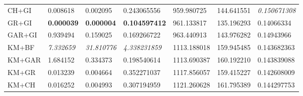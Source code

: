 \begin{table}[H]
\begin{tabular}{lllllll}
        CH+GI      & 0.008618                                                            & 0.002095                                                              & 0.243065556                                                                        & 959.980725           & 144.641551            & \textit{0.150671308}              \\
        GR+GI      & \textbf{0.000039}                                                   & \textbf{0.000004}                                                     & \textbf{0.104597412}                                                               & 961.133817           & 135.196293            & 0.14066334                        \\
        GAR+GI     & 0.939494                                                            & 0.159025                                                              & 0.169266722                                                                        & 963.440913           & 143.976282            & 0.14943966                        \\
        KM+BF      & \textit{7.332659}                                                   & \textit{31.810776}                                                    & \textit{4.338231859}                                                               & 1113.188018          & 159.945485            & 0.143682363                       \\
        KM+GAR     & 1.684152                                                            & 0.334373                                                              & 0.198540614                                                                        & 1113.690387          & 160.192210            & 0.143839088                       \\
        KM+GR      & 0.013239                                                            & 0.004664                                                              & 0.352271037                                                                        & 1117.856057          & 159.415227            & 0.142608009                       \\
        KM+CH      & 0.016252                                                            & 0.004993                                                              & 0.307194959                                                                        & 1121.260628          & 161.795389            & 0.144297753                       \\

\end{tabular}
\end{table}
